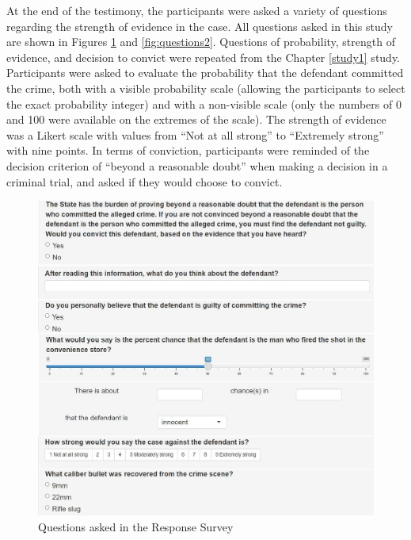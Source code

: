 \documentclass[print]{nuthesis}
\begin{document}
At the end of the testimony, the participants were asked a variety of questions regarding the strength of evidence in the case.
All questions asked in this study are shown in Figures \ref{fig:questions1} and \ref{fig:questions2}.
Questions of probability, strength of evidence, and decision to convict were repeated from the Chapter \ref{study1} study.
Participants were asked to evaluate the probability that the defendant committed the crime, both with a visible probability scale (allowing the participants to select the exact probability integer) and with a non-visible scale (only the numbers of 0 and 100 were available on the extremes of the scale).
The strength of evidence was a Likert scale with values from ``Not at all strong'' to ``Extremely strong'' with nine points.
In terms of conviction, participants were reminded of the decision criterion of ``beyond a reasonable doubt'' when making a decision in a criminal trial, and asked if they would choose to convict.

\begin{figure}

{\centering \includegraphics[width=1\linewidth]{images/study_questions1} 

}

\caption{Questions asked in the Response Survey}\label{fig:questions1}
\end{figure}
\end{document}
